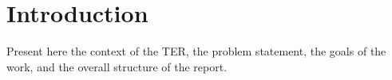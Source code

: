 \chapter{Introduction}

Present here the context of the TER, the problem statement, the goals of the
work, and the overall structure of the report.
